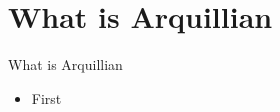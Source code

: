 \section[Introduction]{What is Arquillian}
\begin{frame}{What is Arquillian}
	 \begin{itemize}
	 	\item First
	 \end{itemize}
\end{frame}


